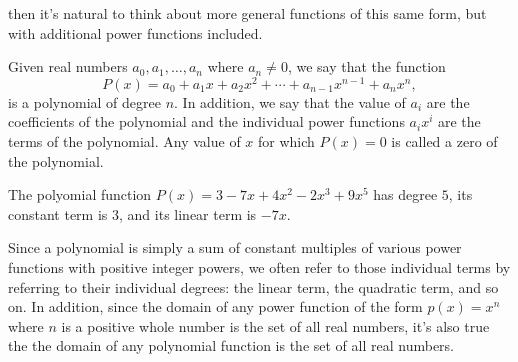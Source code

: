\documentclass{ximera}
\begin{document}
then it's natural to think about more general functions of this same form, but with additional power functions included.%
\begin{definition}
Given real numbers $a_0, a_1, \ldots, a_n$ where $a_n \ne 0$, we say that the function%
$$
P(x) = a_0 + a_1 x + a_2 x^2 + \cdots + a_{n-1}x^{n-1} + a_n x^n, 
$$
is a polynomial of degree $n$.  In addition, we say that the value of $a_i$ are the coefficients of the polynomial and the individual power functions $a_i x^i$ are the terms of the polynomial. Any value of $x$ for which $P(x) = 0$ is called a zero of the polynomial.  
\end{definition}
\begin{example}
The polyomial function $P(x) = 3 - 7x + 4x^2 - 2x^3 + 9x^5$ has degree $5$, its constant term is $3$, and its linear term is $-7x$.%
\end{example}
Since a polynomial is simply a sum of constant multiples of various power functions with positive integer powers, we often refer to those individual terms by referring to their individual degrees:  the linear term, the quadratic term, and so on.  In addition, since the domain of any power function of the form $p(x) = x^n$ where $n$ is a positive whole number is the set of all real numbers, it's also true the the domain of any polynomial function is the set of all real numbers.%
\end{document}
